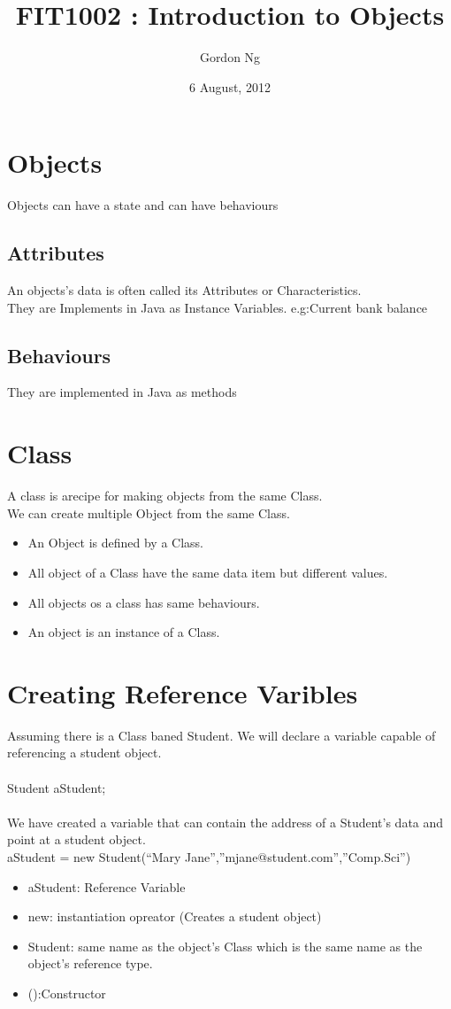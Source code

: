 \documentclass[12pt]{article}
\begin{document}
\title{FIT1002 : Introduction to Objects}
\date{6 August, 2012}
\author{Gordon Ng}
\maketitle

\pagebreak
\tableofcontents
\pagebreak
\section{Objects}
Objects can have a state and can have behaviours
\subsection{Attributes}
An objects's data is often called its Attributes or Characteristics. \\
They are Implements in Java as Instance Variables.
e.g:Current bank balance
\subsection{Behaviours}
They are implemented in Java as methods

\section{Class}
A class is arecipe for making objects from the same Class.\\
We can create multiple Object from the same Class.
\begin{itemize}
\item An Object is defined by a Class.
\item All object of a Class have the same data item but different values.
\item All objects os a class has same behaviours.
\item An object is an instance of a Class.
\end{itemize}


\pagebreak
\section{Creating Reference Varibles}
Assuming there is a Class baned Student. We will declare a variable capable of referencing a student object.  \\
\\
Student aStudent;
\\ \\
We have created a variable that can contain the address of a Student's data and point at a student object.
\\
aStudent = new Student(``Mary Jane'',''mjane@student.com'',''Comp.Sci'')
\\
\begin{itemize}
\item aStudent: Reference Variable
\item new: instantiation opreator (Creates a student object)
\item Student: same name as the object's Class which is the same name as the object's reference type.
\item ():Constructor
\end{itemize}
\end{document}
